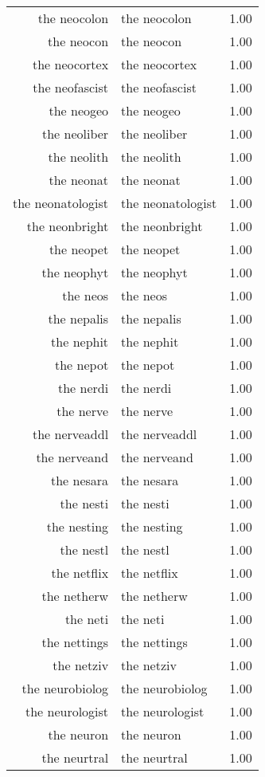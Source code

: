 \begin{table}[ht]
\begin{tabular}{rlr}
  the neocolon & the neocolon & 1.00 \\ 
  the neocon & the neocon & 1.00 \\ 
  the neocortex & the neocortex & 1.00 \\ 
  the neofascist & the neofascist & 1.00 \\ 
  the neogeo & the neogeo & 1.00 \\ 
  the neoliber & the neoliber & 1.00 \\ 
  the neolith & the neolith & 1.00 \\ 
  the neonat & the neonat & 1.00 \\ 
  the neonatologist & the neonatologist & 1.00 \\ 
  the neonbright & the neonbright & 1.00 \\ 
  the neopet & the neopet & 1.00 \\ 
  the neophyt & the neophyt & 1.00 \\ 
  the neos & the neos & 1.00 \\ 
  the nepalis & the nepalis & 1.00 \\ 
  the nephit & the nephit & 1.00 \\ 
  the nepot & the nepot & 1.00 \\ 
  the nerdi & the nerdi & 1.00 \\ 
  the nerve & the nerve & 1.00 \\ 
  the nerveaddl & the nerveaddl & 1.00 \\ 
  the nerveand & the nerveand & 1.00 \\ 
  the nesara & the nesara & 1.00 \\ 
  the nesti & the nesti & 1.00 \\ 
  the nesting & the nesting & 1.00 \\ 
  the nestl & the nestl & 1.00 \\ 
  the netflix & the netflix & 1.00 \\ 
  the netherw & the netherw & 1.00 \\ 
  the neti & the neti & 1.00 \\ 
  the nettings & the nettings & 1.00 \\ 
  the netziv & the netziv & 1.00 \\ 
  the neurobiolog & the neurobiolog & 1.00 \\ 
  the neurologist & the neurologist & 1.00 \\ 
  the neuron & the neuron & 1.00 \\ 
  the neurtral & the neurtral & 1.00 \\ 

\end{tabular}
\end{table}
